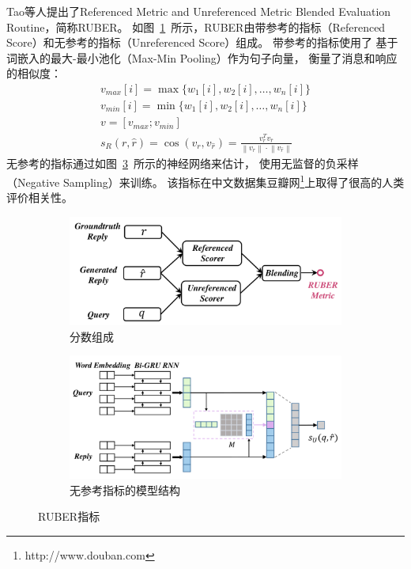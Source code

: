 Tao等人提出了Referenced Metric and Unreferenced Metric Blended Evaluation Routine，简称RUBER。
如图~\ref{fig:RUBER_components}~所示，RUBER由带参考的指标（Referenced Score）和无参考的指标（Unreferenced Score）组成。
带参考的指标使用了
基于词嵌入的最大-最小池化（Max-Min Pooling）作为句子向量，
衡量了消息和响应的相似度：
\begin{align}
    v_{max}[i] = \max \{ w_1[i], w_2[i], \dots, w_n[i] \} \\
    v_{min}[i] = \min \{ w_1[i], w_2[i], \dots, w_n[i] \} \\
    v = [v_{max}; v_{min}] \\
    s_R(r, \hat{r}) = \cos(v_r, v_{\hat{r}}) = \frac{v_r^T v_{\hat{r}}}{\left\| v_r \right\| \cdot \left\| v_{\hat{r}} \right\|}
\end{align}
无参考的指标通过如图~\ref{fig:RUBER_unref_model}~所示的神经网络来估计，
使用无监督的负采样（Negative Sampling）来训练。
该指标在中文数据集豆瓣网\footnote{http://www.douban.com}上取得了很高的人类评价相关性。
\begin{figure}[H]
    \begin{subfigure}{0.5\linewidth}
        \centering
        \includegraphics[width=\linewidth]{figure/RUBER_overview.png}
        \caption{分数组成}
        \label{fig:RUBER_components}
    \end{subfigure}%
    \begin{subfigure}{0.5\linewidth}
        \centering
        \includegraphics[width=\linewidth]{figure/RUBER_model.png}
        \caption{无参考指标的模型结构}
        \label{fig:RUBER_unref_model}
    \end{subfigure}
    \caption{RUBER指标}
\end{figure}


